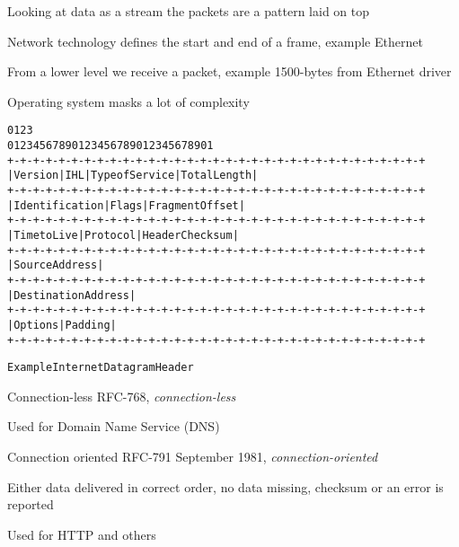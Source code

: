 \documentclass[Screen16to9,17pt]{foils}
\begin{document}
\begin{list1}
\item Looking at data as a stream the packets are a pattern laid on top
\item Network technology defines the start and end of a frame, example Ethernet
\item From a lower level we receive a packet, example 1500-bytes from Ethernet driver
\item Operating system masks a lot of complexity
\end{list1}


\begin{alltt}
\small
    0                   1                   2                   3
    0 1 2 3 4 5 6 7 8 9 0 1 2 3 4 5 6 7 8 9 0 1 2 3 4 5 6 7 8 9 0 1
   +-+-+-+-+-+-+-+-+-+-+-+-+-+-+-+-+-+-+-+-+-+-+-+-+-+-+-+-+-+-+-+-+
   |Version|  IHL  |Type of Service|          Total Length         |
   +-+-+-+-+-+-+-+-+-+-+-+-+-+-+-+-+-+-+-+-+-+-+-+-+-+-+-+-+-+-+-+-+
   |         Identification        |Flags|      Fragment Offset    |
   +-+-+-+-+-+-+-+-+-+-+-+-+-+-+-+-+-+-+-+-+-+-+-+-+-+-+-+-+-+-+-+-+
   |  Time to Live |    Protocol   |         Header Checksum       |
   +-+-+-+-+-+-+-+-+-+-+-+-+-+-+-+-+-+-+-+-+-+-+-+-+-+-+-+-+-+-+-+-+
   |                       Source Address                          |
   +-+-+-+-+-+-+-+-+-+-+-+-+-+-+-+-+-+-+-+-+-+-+-+-+-+-+-+-+-+-+-+-+
   |                    Destination Address                        |
   +-+-+-+-+-+-+-+-+-+-+-+-+-+-+-+-+-+-+-+-+-+-+-+-+-+-+-+-+-+-+-+-+
   |                    Options                    |    Padding    |
   +-+-+-+-+-+-+-+-+-+-+-+-+-+-+-+-+-+-+-+-+-+-+-+-+-+-+-+-+-+-+-+-+

                    Example Internet Datagram Header
\end{alltt}


\begin{list1}
\item Connection-less RFC-768, \emph{connection-less}
\item Used for Domain Name Service (DNS)
\end{list1}


\begin{list1}
\item Connection oriented RFC-791 September 1981, \emph{connection-oriented}
\item Either data delivered in correct order, no data missing, checksum or an error is reported
\item Used for HTTP and others
\end{list1}
\end{document}
